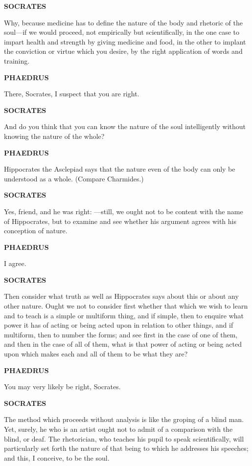 \documentclass[11pt,letter]{article}
\begin{document}
\par \textbf{SOCRATES}
\par   Why, because medicine has to define the nature of the body and rhetoric of the soul—if we would proceed, not empirically but scientifically, in the one case to impart health and strength by giving medicine and food, in the other to implant the conviction or virtue which you desire, by the right application of words and training.

\par \textbf{PHAEDRUS}
\par   There, Socrates, I suspect that you are right.

\par \textbf{SOCRATES}
\par   And do you think that you can know the nature of the soul intelligently without knowing the nature of the whole?

\par \textbf{PHAEDRUS}
\par   Hippocrates the Asclepiad says that the nature even of the body can only be understood as a whole. (Compare Charmides.)

\par \textbf{SOCRATES}
\par   Yes, friend, and he was right: —still, we ought not to be content with the name of Hippocrates, but to examine and see whether his argument agrees with his conception of nature.

\par \textbf{PHAEDRUS}
\par   I agree.

\par \textbf{SOCRATES}
\par   Then consider what truth as well as Hippocrates says about this or about any other nature. Ought we not to consider first whether that which we wish to learn and to teach is a simple or multiform thing, and if simple, then to enquire what power it has of acting or being acted upon in relation to other things, and if multiform, then to number the forms; and see first in the case of one of them, and then in the case of all of them, what is that power of acting or being acted upon which makes each and all of them to be what they are?

\par \textbf{PHAEDRUS}
\par   You may very likely be right, Socrates.

\par \textbf{SOCRATES}
\par   The method which proceeds without analysis is like the groping of a blind man. Yet, surely, he who is an artist ought not to admit of a comparison with the blind, or deaf. The rhetorician, who teaches his pupil to speak scientifically, will particularly set forth the nature of that being to which he addresses his speeches; and this, I conceive, to be the soul.
\end{document}
